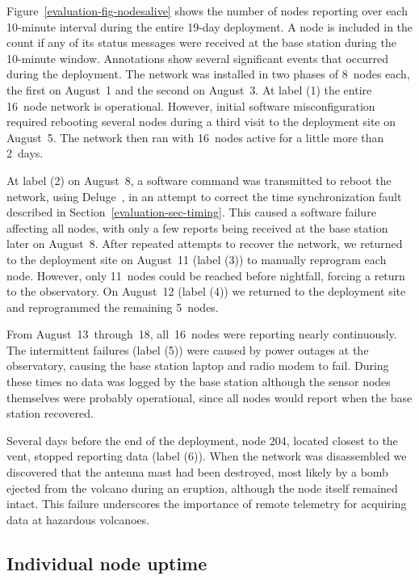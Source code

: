 Figure~\ref{evaluation-fig-nodesalive} shows the number of nodes reporting
over each 10-minute interval during the entire 19-day deployment. A node is
included in the count if any of its status messages were received at the base
station during the 10-minute window.  Annotations show several significant
events that occurred during the deployment. The network was installed in two
phases of 8~nodes each, the first on August~1 and the second on August~3.  At
label (1) the entire 16~node network is operational.  However, initial
software misconfiguration required rebooting several nodes during a third
visit to the deployment site on August~5.  The network then ran with 16~nodes
active for a little more than 2~days. 

At label (2) on August~8, a software command was transmitted to reboot the
network, using Deluge~\cite{deluge}, in an attempt to correct the time
synchronization fault described in Section~\ref{evaluation-sec-timing}.  This
caused a software failure affecting all nodes, with only a few reports being
received at the base station later on August~8.  After repeated attempts to
recover the network, we returned to the deployment site on August~11 (label
(3)) to manually reprogram each node.  However, only 11~nodes could be
reached before nightfall, forcing a return to the observatory. On August~12
(label (4)) we returned to the deployment site and reprogrammed the remaining
5~nodes. 

From August~13~through~18, all~16~nodes were reporting nearly continuously.
The intermittent failures (label (5)) were caused by power outages at the
observatory, causing the base station laptop and radio modem to fail. During
these times no data was logged by the base station although the sensor nodes
themselves were probably operational, since all nodes would report when the
base station recovered.

Several days before the end of the deployment, node 204, located closest to
the vent, stopped reporting data (label (6)). When the network was
disassembled we discovered that the antenna mast had been destroyed, most
likely by a bomb ejected from the volcano during an eruption, although the
node itself remained intact.  This failure underscores the importance of
remote telemetry for acquiring data at hazardous volcanoes.

\subsection{Individual node uptime}

